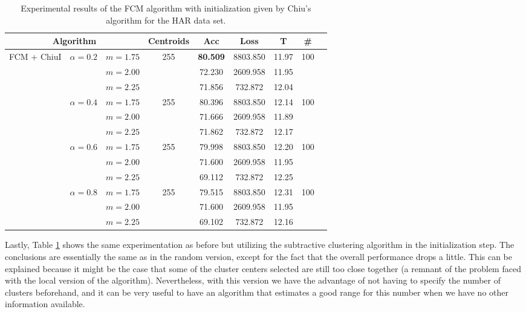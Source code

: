 \begin{table}[h!]
  \centering
\caption{Experimental results of the FCM algorithm with initialization given by Chiu's algorithm for the HAR data set.}
\label{tab:har3}
\begin{tabular}{ccccccccc}
\toprule
\multicolumn{3}{c}{Algorithm} & Centroids & Acc & Loss & T & \# \\ \midrule
\multirow{12}{*}{FCM + ChiuI} & \multirow{3}{*}{$\alpha = 0.2$} & $m=1.75$ & \multirow{3}{*}{255} & \textbf{80.509} & 8803.850 & 11.97 & \multirow{3}{*}{100}\\ \
 &  & $m=2.00$ &  & 72.230 & 2609.958 & 11.95 &\\
 &  & $m=2.25$ &  & 71.856 & 732.872 & 12.04 &\\ \cline{2-8}
 & \multirow{3}{*}{$\alpha = 0.4$} & $m=1.75$ & \multirow{3}{*}{255} & 80.396 & 8803.850 & 12.14 &\multirow{3}{*}{100}\\
 &  & $m=2.00$ &  & 71.666 & 2609.958 & 11.89 &\\
 &  & $m=2.25$ &  & 71.862 & 732.872 & 12.17 & \\ \cline{2-8}
 & \multirow{3}{*}{$\alpha = 0.6$} & $m=1.75$ & \multirow{3}{*}{255} & 79.998 & 8803.850 & 12.20 &\multirow{3}{*}{100}\\
 &  & $m=2.00$ &  & 71.600 & 2609.958 & 11.95 &\\
 &  & $m=2.25$ &  & 69.112 & 732.872 & 12.25 &\\ \cline{2-8}
 & \multirow{3}{*}{$\alpha = 0.8$} & $m=1.75$ & \multirow{3}{*}{255} & 79.515 & 8803.850 & 12.31 &\multirow{3}{*}{100}\\
 &  & $m=2.00$ &  & 71.600 & 2609.958 & 11.95 &\\
 &  & $m=2.25$ &  & 69.102 & 732.872 & 12.16 &\\ \bottomrule
\end{tabular}
\end{table}

Lastly, Table \ref{tab:har3} shows the same experimentation as before but utilizing the subtractive clustering algorithm in the initialization step. The conclusions are essentially the same as in the random version, except for the fact that the overall performance drops a little. This can be explained because it might be the case that some of the cluster centers selected are still too close together (a remnant of the problem faced with the local version of the algorithm). Nevertheless, with this version we have the advantage of not having to specify the number of clusters beforehand, and it can be very useful to have an algorithm that estimates a good range for this number when we have no other information available.

